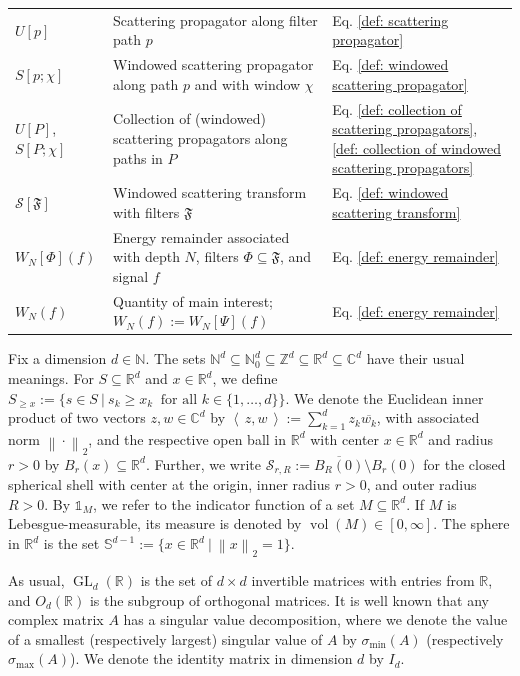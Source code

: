 \documentclass[11pt]{amsart}
\newcommand{\R}{{\mathbb{R}}}
\newcommand{\C}{{\mathbb{C}}}
\newcommand{\N}{\mathbb{N}}
\newcommand{\Z}{\mathbb{Z}}
\newcommand{\s}{\mathcal{S}}
\newcommand{\norm}[1]{\ensuremath{\left\lVert\text{}#1\text{}\right\rVert}}
\newcommand{\ip}[1]{\ensuremath{\left<\text{} \, #1 \, \text{}\right>}}
\DeclareMathOperator{\GL}{GL}
\DeclareMathOperator{\vol}{vol}
\newenvironment{proof sketch} {\textit{Proof sketch.}}{}
\begin{document}
\begin{table}[h!]
{\begin{tabular}{@{}lll@{}}
  			$U[p]$ & Scattering propagator along filter path $p$ & Eq. \eqref{def: scattering propagator} \\
  			$S[p;\chi]$ & Windowed scattering propagator along path $p$ and with window $\chi$ & Eq. \eqref{def: windowed scattering propagator} \\
  			$U[P]$, $S[P;\chi]$ & Collection of (windowed) scattering propagators along paths in $P$ & Eq. \eqref{def: collection of scattering propagators}, \eqref{def: collection of windowed scattering propagators} \\
  			$\s[\mathfrak{F}]$ & Windowed scattering transform with filters $\mathfrak{F}$ & Eq. \eqref{def: windowed scattering transform} \\
  			$W_N[\Phi](f)$ & Energy remainder associated with depth $N$, filters $\Phi\subseteq \mathfrak{F}$, and signal $f$ & Eq. \eqref{def: energy remainder}\\
  			$W_N(f)$ & Quantity of main interest; $W_N(f):=W_N[\Psi](f)$ & Eq. \eqref{def: energy remainder} \\
  			\bottomrule
  	\end{tabular}}
  \end{table}

  Fix a dimension $d \in \N$. The sets $\N^d\subseteq\N_0^d\subseteq\Z^d\subseteq \R^d \subseteq \C^d$ have their usual meanings. For $S\subseteq \R^d$ and $x \in \R^d$, we define $S_{\geq x}:=\{s \in S ~|~ s_k \geq x_k ~ \text{ for all } k \in \{1,\ldots,d\}\}$. We denote the Euclidean inner product of two vectors $z,w \in \C^d$ by $\ip{z,w}:=\sum_{k=1}^d z_k \overline{w_k}$, with associated norm $\norm{\cdot}_2$, and the respective open ball in $\R^d$ with center $x \in \R^d$ and radius $r>0$ by $B_r(x)\subseteq \R^d$. Further, we write $\s_{r,R}:=\overline{B_R(0)}\setminus B_r(0)$ for the closed spherical shell with center at the origin, inner radius $r>0$, and outer radius $R>0$. By $\mathds{1}_M$, we refer to the indicator function of a set $M \subseteq \R^d$. If $M$ is Lebesgue-measurable, its measure is denoted by $\vol(M)\in [0,\infty]$. The sphere in $\R^d$ is the set $\mathbb{S}^{d-1}:=\{x \in \R^d ~|~ \norm{x}_2=1\}$.
  
  As usual, $\GL_d(\R)$ is the set of $d\times d$ invertible matrices with entries from $\R$, and $O_d(\R)$ is the subgroup of orthogonal matrices. It is well known that any complex matrix $A$ has a singular value decomposition, where we denote the value of a smallest (respectively largest) singular value of $A$ by $\sigma_{\text{min}}(A)$ (respectively $\sigma_{\text{max}}(A)$). We denote the identity matrix in dimension $d$ by $I_d$. 
  
\end{document}
